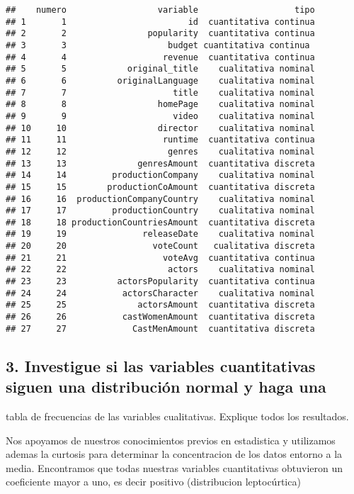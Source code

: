 \documentclass[
]{article}
\begin{document}
\begin{verbatim}
##    numero                  variable                   tipo
## 1       1                        id  cuantitativa continua
## 2       2                popularity  cuantitativa continua
## 3       3                    budget cuantitativa continua 
## 4       4                   revenue  cuantitativa continua
## 5       5            original_title    cualitativa nominal
## 6       6          originalLanguage    cualitativa nominal
## 7       7                     title    cualitativa nominal
## 8       8                  homePage    cualitativa nominal
## 9       9                     video    cualitativa nominal
## 10     10                  director    cualitativa nominal
## 11     11                   runtime  cuantitativa continua
## 12     12                    genres    cualitativa nominal
## 13     13              genresAmount  cuantitativa discreta
## 14     14         productionCompany    cualitativa nominal
## 15     15        productionCoAmount  cuantitativa discreta
## 16     16  productionCompanyCountry    cualitativa nominal
## 17     17         productionCountry    cualitativa nominal
## 18     18 productionCountriesAmount  cuantitativa discreta
## 19     19               releaseDate    cualitativa nominal
## 20     20                 voteCount   cualitativa discreta
## 21     21                   voteAvg  cuantitativa continua
## 22     22                    actors    cualitativa nominal
## 23     23          actorsPopularity  cuantitativa continua
## 24     24           actorsCharacter    cualitativa nominal
## 25     25              actorsAmount  cuantitativa discreta
## 26     26           castWomenAmount  cuantitativa discreta
## 27     27             CastMenAmount  cuantitativa discreta
\end{verbatim}

\hypertarget{investigue-si-las-variables-cuantitativas-siguen-una-distribuciuxf3n-normal-y-haga-una}{%
\subsection{3. Investigue si las variables cuantitativas siguen una
distribución normal y haga
una}\label{investigue-si-las-variables-cuantitativas-siguen-una-distribuciuxf3n-normal-y-haga-una}}

tabla de frecuencias de las variables cualitativas. Explique todos los
resultados.

Nos apoyamos de nuestros conocimientos previos en estadistica y
utilizamos ademas la curtosis para determinar la concentracion de los
datos entorno a la media. Encontramos que todas nuestras variables
cuantitativas obtuvieron un coeficiente mayor a uno, es decir positivo
(distribucion leptocúrtica)
\end{document}
